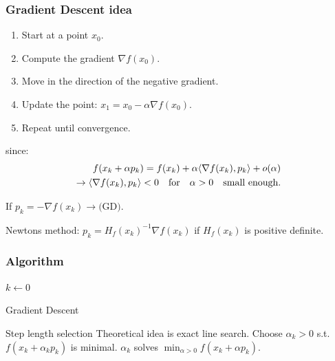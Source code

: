 \subsubsection*{Gradient Descent idea}
\begin{enumerate}
  \item Start at a point \( x_0 \).
  \item Compute the gradient \( \nabla f(x_0) \).
  \item Move in the direction of the negative gradient.
  \item Update the point: \( x_1 = x_0 - \alpha \nabla f(x_0) \).
  \item Repeat until convergence.
\end{enumerate}

since:
\begin{align*}
  f(x_k + \alpha p_k) = f(x_k) + \alpha \langle\nabla f(x_k), p_k\rangle + o(\alpha) \\
  \rightarrow \langle\nabla f(x_k), p_k\rangle < 0 \quad \text{for} \quad \alpha > 0 \quad \text{small enough}.
\end{align*}

\begin{example}{}{}
  If  \(p_k = - \nabla f(x_k) \rightarrow \text{(GD)}\).

  Newtons method:  \(p_k = H_f(x_k)^{-1} \nabla f(x_k)\) if  \(H_f(x_k)\) is positive definite.
\end{example}

\subsubsection*{Algorithm}
\begin{algorithm}[H]
  \SetAlgoLined
  \(k \gets 0\)\;
  \;
  \caption{Gradient Descent}
\end{algorithm}

\begin{remark}{Step length selection}{}
  Theoretical idea is exact line search. Choose  \(\alpha_k > 0\) s.t.  \(f(x_k + \alpha_k p_k)\) is minimal.
  \(\alpha_k\) solves  \(\min_{\alpha > 0} f(x_k + \alpha p_k)\).
\end{remark}

